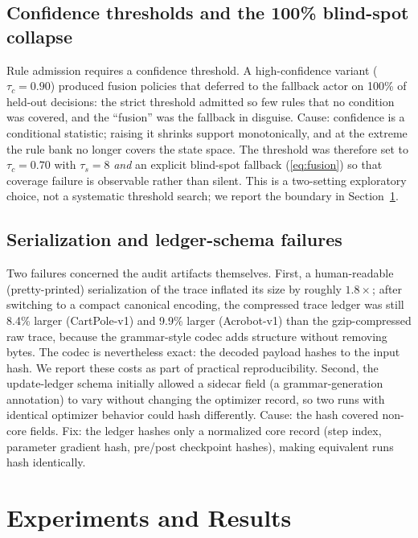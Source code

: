 \documentclass[11pt]{article}
\begin{document}
\subsection{Confidence thresholds and the 100\% blind-spot collapse}
\label{sec:evolution:threshold}

Rule admission requires a confidence threshold. A high-confidence variant ($\tau_c=0.90$) produced
fusion policies that deferred to the fallback actor on 100\% of held-out decisions: the strict
threshold admitted so few rules that no condition was covered, and the ``fusion'' was the fallback
in disguise. Cause: confidence is a conditional statistic; raising it shrinks support monotonically,
and at the extreme the rule bank no longer covers the state space. The threshold was therefore set
to $\tau_c=0.70$ with $\tau_s=8$ \emph{and} an explicit blind-spot fallback (\ref{eq:fusion}) so
that coverage failure is observable rather than silent. This is a two-setting exploratory choice,
not a systematic threshold search; we report the boundary in
Section~\ref{sec:experiments}.

\subsection{Serialization and ledger-schema failures}
\label{sec:evolution:serialization}

Two failures concerned the audit artifacts themselves. First, a human-readable (pretty-printed)
serialization of the trace inflated its size by roughly $1.8\times$; after switching to a compact
canonical encoding, the compressed trace ledger was still 8.4\% larger (CartPole-v1) and 9.9\%
larger (Acrobot-v1) than the gzip-compressed raw trace, because the grammar-style codec adds
structure without removing bytes. The codec is nevertheless exact: the decoded payload hashes to the
input hash. We report these costs as part of practical reproducibility. Second, the update-ledger
schema initially allowed a sidecar field (a grammar-generation annotation) to vary without changing
the optimizer record, so two runs with identical optimizer behavior could hash differently.
Cause: the hash covered non-core fields. Fix: the ledger hashes only a normalized core record
(step index, parameter gradient hash, pre/post checkpoint hashes), making equivalent runs hash
identically.

\section{Experiments and Results}
\label{sec:experiments}
\end{document}
